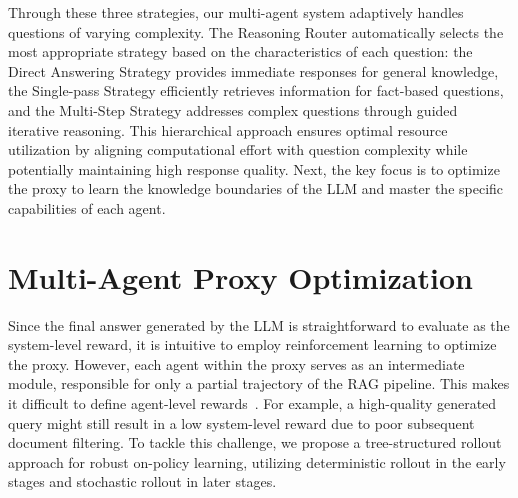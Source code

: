 Through these three strategies, our multi-agent system adaptively handles questions of varying complexity. 
The Reasoning Router automatically selects the most appropriate strategy based on the characteristics of each question: the Direct Answering Strategy provides immediate responses for general knowledge, the Single-pass Strategy efficiently retrieves information for fact-based questions, and the Multi-Step Strategy addresses complex questions through guided iterative reasoning. 
This hierarchical approach ensures optimal resource utilization by aligning computational effort with question complexity while potentially maintaining high response quality.
Next, the key focus is to optimize the proxy to learn the knowledge boundaries of the LLM and master the specific capabilities of each agent.

\section{Multi-Agent Proxy Optimization}\label{sec:tree_opt}
Since the final answer generated by the LLM is straightforward to evaluate as the system-level reward, it is intuitive to employ reinforcement learning to optimize the proxy. 
However, each agent within the proxy serves as an intermediate module, responsible for only a partial trajectory of the RAG pipeline.
This makes it difficult to define agent-level rewards~\citep{GuinetODC24}. 
For example, a high-quality generated query might still result in a low system-level reward due to poor subsequent document filtering. 
To tackle this challenge, we propose a tree-structured rollout approach for robust on-policy learning, utilizing deterministic rollout in the early stages and stochastic rollout in later stages.



